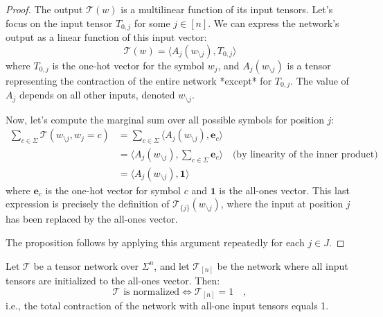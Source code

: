 \documentclass[../../main.tex]{subfiles}
\begin{document}
    \begin{proof}
The output $\mathcal{T}(w)$ is a multilinear function of its input tensors. Let's focus on the input tensor $T_{0,j}$ for some $j \in [n]$. We can express the network's output as a linear function of this input vector:
\[
    \mathcal{T}(w) = \langle A_j(w_{\setminus j}), T_{0,j} \rangle
\]
where $T_{0,j}$ is the one-hot vector for the symbol $w_j$, and $A_j(w_{\setminus j})$ is a tensor representing the contraction of the entire network *except* for $T_{0,j}$. The value of $A_j$ depends on all other inputs, denoted $w_{\setminus j}$.

Now, let's compute the marginal sum over all possible symbols for position $j$:
\begin{align*}
    \sum_{c \in \Sigma} \mathcal{T}(w_{\setminus j}, w_j=c) &= \sum_{c \in \Sigma} \langle A_j(w_{\setminus j}), \mathbf{e}_c \rangle \\
    &= \langle A_j(w_{\setminus j}), \sum_{c \in \Sigma} \mathbf{e}_c \rangle \quad \text{(by linearity of the inner product)} \\
    &= \langle A_j(w_{\setminus j}), \mathbf{1} \rangle
\end{align*}
where $\mathbf{e}_c$ is the one-hot vector for symbol $c$ and $\mathbf{1}$ is the all-ones vector. This last expression is precisely the definition of $\mathcal{T}_{\{j\}}(w_{\setminus j})$, where the input at position $j$ has been replaced by the all-ones vector.

The proposition follows by applying this argument repeatedly for each $j \in J$.
\end{proof}

    \begin{corollary}
        Let $\mathcal{T}$ be a tensor network over $\Sigma^n$, and let $\mathcal{T}_{[n]}$ be the network where all input tensors are initialized to the all-ones vector. Then:
        \[
            \mathcal{T} \text{ is normalized} \iff \mathcal{T}_{[n]} = 1 \quad ,
        \]
        i.e., the total contraction of the network with all-one input tensors equals 1.
    \end{corollary}
\end{document}
